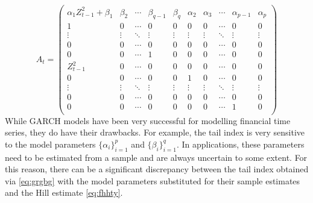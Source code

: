 \begin{equation}
  \label{eq:A_matrix:intro}
  A_t =
  \begin{pmatrix}
    \alpha_1 Z_{t-1}^2 + \beta_1 & \beta_2 & \cdots &
    \beta_{q-1} & \beta_q & \alpha_2 & \alpha_3 &
    \cdots & \alpha_{p-1} & \alpha_p\\
    1 & 0 & \cdots & 
    0 & 0 & 0 & 0 & \cdots & 0 & 0 \\
    \vdots & \vdots & \ddots & 
    \vdots & \vdots & \vdots & \vdots &
    \ddots & \vdots & \vdots \\
    0 & 0 & \cdots &
    0 & 0 & 0 & 0 & \cdots & 0 & 0 \\
    0 & 0 & \cdots &
    1 & 0 & 0 & 0 & \cdots & 0 & 0 \\
    Z_{t-1}^2 & 0 & \cdots &
    0 & 0 & 0 & 0 & \cdots & 0 & 0 \\
    0 & 0 & \cdots &
    0 & 0 & 1 & 0 & \cdots & 0 & 0 \\
    \vdots & \vdots & \ddots &
    \vdots & \vdots & \vdots & \vdots &
    \ddots & \vdots & \vdots \\
    0 & 0 & \cdots &
    0 & 0 & 0 & 0 & \cdots & 0 & 0 \\    
    0 & 0 & \cdots &
    0 & 0 & 0 & 0 & \cdots & 1 & 0 \\    
  \end{pmatrix}
\end{equation}
While GARCH models have been very successful for modelling financial
time series, they do have their drawbacks. For example, the tail
index is very sensitive to the model parameters $\{\alpha_i\}_{i=1}^p$ and
$\{\beta_i\}_{i=1}^q$. In applications, these parameters need to be
estimated from a sample and are always uncertain to some extent. For
this reason, there can be a significant discrepancy between the tail
index obtained via \eqref{eq:grgbg} with the model parameters
substituted for their sample estimates and the Hill estimate
\eqref{eq:fhhty}.


